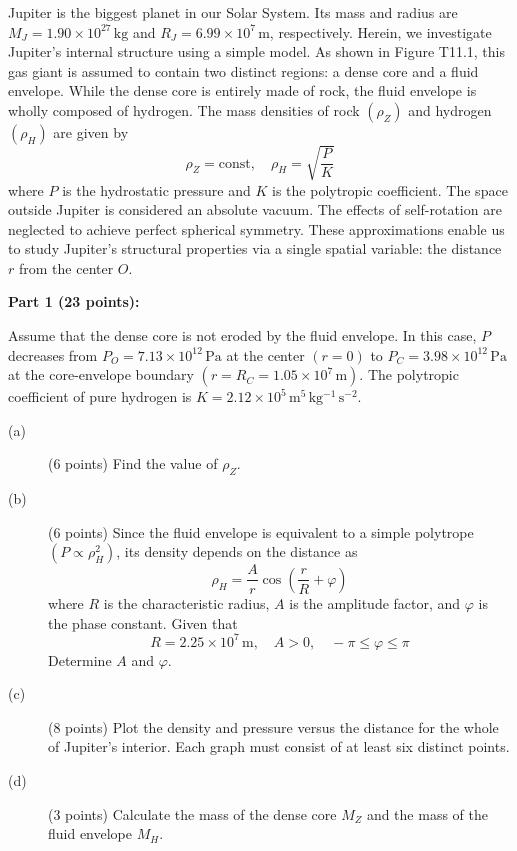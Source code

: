 Jupiter is the biggest planet in our Solar System. Its mass and radius are
$M_J = 1.90 \times 10^{27}\,\mathrm{kg}$ and $R_J = 6.99 \times 10^{7}\,\mathrm{m}$,
respectively. Herein, we investigate Jupiter's internal structure using a
simple model. As shown in Figure T11.1, this gas giant is assumed to contain
two distinct regions: a dense core and a fluid envelope. While the dense core
is entirely made of rock, the fluid envelope is wholly composed of hydrogen.
The mass densities of rock $(\rho_Z)$ and hydrogen $(\rho_H)$ are given by
\[ \rho_Z = \mathrm{const}, \quad \rho_H = \sqrt{\frac{P}{K}} \]
where $P$ is the hydrostatic pressure and $K$ is the polytropic coefficient.
The space outside Jupiter is considered an absolute vacuum. The effects of
self-rotation are neglected to achieve perfect spherical symmetry. These
approximations enable us to study Jupiter's structural properties via a single
spatial variable: the distance $r$ from the center $O$.


\medskip\noindent\textbf{Part 1 (23 points):}

Assume that the dense core is not eroded by the fluid envelope. In this case,
$P$ decreases from $P_O = 7.13 \times 10^{12}\,\mathrm{Pa}$ at the center
$(r = 0)$ to $P_C = 3.98 \times 10^{12}\,\mathrm{Pa}$ at the core-envelope
boundary $(r = R_C = 1.05 \times 10^{7}\,\mathrm{m})$. The polytropic
coefficient of pure hydrogen is
$K = 2.12 \times 10^{5}\,\mathrm{m^5\,kg^{-1}\,s^{-2}}$.

\begin{description}
\item[(a)] (6 points) Find the value of $\rho_Z$.
\item[(b)] (6 points) Since the fluid envelope is equivalent to a simple
  polytrope $(P \propto \rho_H^2)$, its density depends on the distance as
  \[ \rho_H = \frac{A}{r}\cos\left(\frac{r}{R} + \varphi\right) \]
  where $R$ is the characteristic radius, $A$ is the amplitude factor, and
  $\varphi$ is the phase constant. Given that
  \[ R = 2.25 \times 10^{7}\,\mathrm{m}, \quad A > 0, \quad
     -\pi \le \varphi \le \pi \]
  Determine $A$ and $\varphi$.
\item[(c)] (8 points) Plot the density and pressure versus the distance for
  the whole of Jupiter's interior. Each graph must consist of at least six
  distinct points.
\item[(d)] (3 points) Calculate the mass of the dense core $M_Z$ and the mass
  of the fluid envelope $M_H$.
\end{description}

